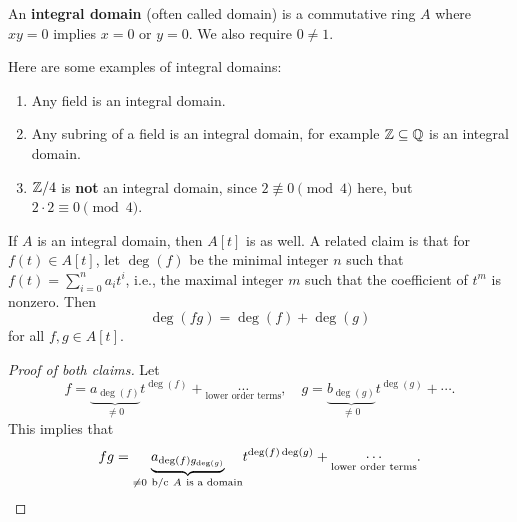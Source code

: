 \begin{definition}[]
    An \textbf{integral domain} (often called domain) is a commutative ring $A$ where $xy=0$ implies $x=0$ or $y=0$. We also require $0\neq 1$.
\end{definition}
\begin{example}
    Here are some examples of integral domains:
    \begin{enumerate}[label=(\arabic*)]
    \setlength\itemsep{-.2em}
\item Any field is an integral domain.
\item Any subring of a field is an integral domain, for example $\mathbb{Z} \subseteq \mathbb{Q}$ is an integral domain.
\item $\mathbb{Z} /4$ is \textbf{not} an integral domain, since $2 \not \equiv 0 \pmod 4$ here, but $2 \cdot  2 \equiv 0 \pmod 4$.
    \end{enumerate}
\end{example}
\begin{claim}
    If $A$ is an integral domain, then $A[t]$ is as well. A related claim is that for $f(t) \in  A[t]$, let $\deg (f)$ be the minimal integer $n$ such that $f(t) = \sum _{i=0}^n  a_i t ^i $, i.e., the maximal integer $m$ such that the coefficient of $t ^m$ is nonzero. Then \[
        \deg(fg)=\deg(f)+\deg(g)
    \] for all $f,g \in A[t]$.
\end{claim}
\begin{proof}[Proof of both claims]
   Let \[
       f= \underset{\neq 0}{\underbrace{ a _{\deg(f)} }}  t ^{\deg (f)}+ \underset{\text{lower order terms} }{\cdots } ,\quad g = \underset{\neq 0}{\underbrace{b _{\deg (g)}} }t ^{\deg (g)} + \cdots .
   \]  This implies that \[
   fg = \underset{\neq 0 \ \text{b/c} \ A \ \text{is a domain} }{\underbrace{a _{\deg (f) g _{\deg(g)}}} } t ^{\deg(f)\deg(g)}+ \underset{ \text{lower order terms} }{\cdots }. \qedhere
   \] 
\end{proof}

